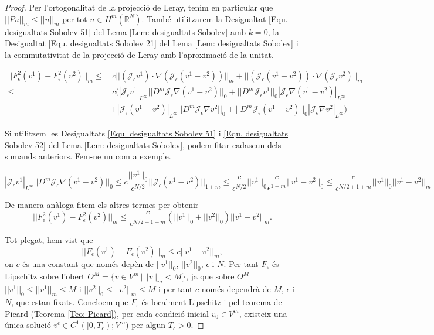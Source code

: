 \documentclass{article}
\numberwithin{equation}{section}
\begin{document}
\begin{proof}
Per l'ortogonalitat de la projecci\'{o} de Leray, tenim en particular que $||Pu||_m\leq||u||_m$ per tot $u\in H^m(\mathbb{R}^N)$. Tamb\'{e} utilitzarem la Desigualtat \eqref{Equ. desigualtats Sobolev 51} del Lema \ref{Lem: desigualtats Sobolev} amb $k=0$, la Desigualtat \eqref{Equ. desigualtats Sobolev 21} del Lema \ref{Lem: desigualtats Sobolev} i la commutativitat de la projecci\'{o} de Leray amb l'aproximaci\'{o} de la unitat.

\begin{align*}
||F_{\epsilon}^2(v^1)-F_{\epsilon}^2(v^2)||_m\leq&\,c||(\mathcal{J}_{\epsilon}v^1)\cdot\nabla(\mathcal{J}_{\epsilon}(v^1-v^2))||_m+||(\mathcal{J}_{\epsilon}(v^1-v^2))\cdot\nabla(\mathcal{J}_{\epsilon}v^2)||_m\\
\leq&\,c\Big(|\mathcal{J}_{\epsilon}v^1|_{L^{\infty}}||D^m\mathcal{J}_{\epsilon}\nabla(v^1-v^2)||_0+||D^m\mathcal{J}_{\epsilon}v^1||_0|\mathcal{J}_{\epsilon}\nabla(v^1-v^2)|_{L^{\infty}}\\
&+|\mathcal{J}_{\epsilon}(v^1-v^2)|_{L^{\infty}}||D^m\mathcal{J}_{\epsilon}\nabla v^2||_0+||D^m\mathcal{J}_{\epsilon}(v^1-v^2)||_0|\mathcal{J}_{\epsilon}\nabla v^2|_{L^{\infty}}\Big)
\end{align*}

Si utilitzem les Desigualtats \eqref{Equ. desigualtats Sobolev 51} i \eqref{Equ. desigualtats Sobolev 52} del Lema \ref{Lem: desigualtats Sobolev}, podem fitar cadascun dels sumands anteriors. Fem-ne un com a exemple.

\[|\mathcal{J}_{\epsilon}v^1|_{L^{\infty}}||D^m\mathcal{J}_{\epsilon}\nabla(v^1-v^2)||_0\leq c\frac{||v^1||_0}{\epsilon^{N/2}}||\mathcal{J}_{\epsilon}(v^1-v^2)||_{1+m}\leq\frac{c}{\epsilon^{N/2}}||v^1||_0\frac{c}{\epsilon^{1+m}}||v^1-v^2||_0\leq\frac{c}{\epsilon^{N/2+1+m}}||v^1||_0||v^1-v^2||_m\]

De manera an\`{a}loga fitem els altres termes per obtenir
\[||F_{\epsilon}^2(v^1)-F_{\epsilon}^2(v^2)||_m\leq\frac{c}{\epsilon^{N/2+1+m}}(||v^1||_0+||v^2||_0)||v^1-v^2||_m.\]

Tot plegat, hem vist que
\begin{equation}\label{Equ. F Lipschitz}
||F_{\epsilon}(v^1)-F_{\epsilon}(v^2)||_m\leq c||v^1-v^2||_m,
\end{equation}
on $c$ \'{e}s una constant que nom\'{e}s dep\`{e}n de $||v^1||_0$, $||v^2||_0$, $\epsilon$ i $N$. Per tant $F_{\epsilon}$ \'{e}s Lipschitz sobre l'obert $O^M=\{v\in V^m\,|\,||v||_m<M\}$, ja que sobre $O^M$ $||v^1||_0\leq||v^1||_m\leq M$ i $||v^2||_0\leq||v^2||_m\leq M$ i per tant $c$ nom\'{e}s dependr\`{a} de $M$, $\epsilon$ i $N$, que estan fixats. Concloem que $F_{\epsilon}$ \'{e}s localment Lipschitz i pel teorema de Picard (Teorema \ref{Teo: Picard}), per cada condici\'{o} inicial $v_0\in V^m$, existeix una \'{u}nica soluci\'{o} $v^{\epsilon}\in C^1([0,T_{\epsilon});V^m)$ per algun $T_{\epsilon}>0$.
\end{proof}
\end{document}
